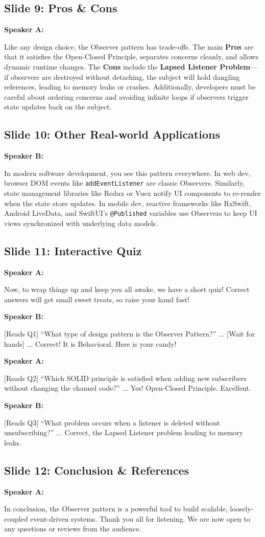 \documentclass[11pt,a4paper]{article}
\newenvironment{dialogue}[1]{
    \begin{mdframed}[linecolor=gray!40,backgroundcolor=gray!5,roundcorner=5pt,innerleftmargin=10pt,innerrightmargin=10pt,innertopmargin=8pt,innerbottommargin=8pt]
    \textbf{#1:}
}{
    \end{mdframed}
}
\begin{document}
\subsection*{Slide 9: Pros \& Cons}
\begin{dialogue}{Speaker A}
    Like any design choice, the Observer pattern has trade-offs. 
    The main \textbf{Pros} are that it satisfies the Open-Closed Principle, separates concerns cleanly, and allows dynamic runtime changes. 
    The \textbf{Cons} include the \textbf{Lapsed Listener Problem}---if observers are destroyed without detaching, the subject will hold dangling references, leading to memory leaks or crashes. Additionally, developers must be careful about ordering concerns and avoiding infinite loops if observers trigger state updates back on the subject.
\end{dialogue}

\subsection*{Slide 10: Other Real-world Applications}
\begin{dialogue}{Speaker B}
    In modern software development, you see this pattern everywhere. 
    In web dev, browser DOM events like \texttt{addEventListener} are classic Observers. Similarly, state management libraries like Redux or Vuex notify UI components to re-render when the state store updates.
    In mobile dev, reactive frameworks like RxSwift, Android LiveData, and SwiftUI's \texttt{@Published} variables use Observers to keep UI views synchronized with underlying data models.
\end{dialogue}

\subsection*{Slide 11: Interactive Quiz}
\begin{dialogue}{Speaker A}
    Now, to wrap things up and keep you all awake, we have a short quiz! Correct answers will get small sweet treats, so raise your hand fast!
\end{dialogue}
\begin{dialogue}{Speaker B}
    {[Reads Q1]} ``What type of design pattern is the Observer Pattern?'' ... {[Wait for hands]} ... Correct! It is Behavioral. Here is your candy!
\end{dialogue}
\begin{dialogue}{Speaker A}
    {[Reads Q2]} ``Which SOLID principle is satisfied when adding new subscribers without changing the channel code?'' ... Yes! Open-Closed Principle. Excellent.
\end{dialogue}
\begin{dialogue}{Speaker B}
    {[Reads Q3]} ``What problem occurs when a listener is deleted without unsubscribing?'' ... Correct, the Lapsed Listener problem leading to memory leaks.
\end{dialogue}

\subsection*{Slide 12: Conclusion \& References}
\begin{dialogue}{Speaker A}
    In conclusion, the Observer pattern is a powerful tool to build scalable, loosely-coupled event-driven systems. Thank you all for listening. We are now open to any questions or reviews from the audience.
\end{dialogue}
\end{document}
